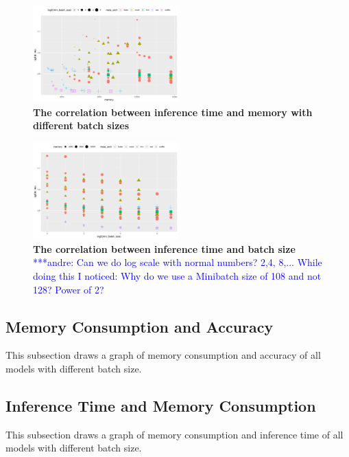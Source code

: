 \documentclass[conference]{IEEEtran}
\newcommand{\alnote}[1]{ {\textcolor{blue} { ***andre: #1 }}}
\newcommand{\alnote}[1]{}
\begin{document}
\begin{figure}[htpb]
	  \centering
	  \includegraphics[width=0.5\textwidth]{RunningTimeVSMemory-Batch}
	  \caption{\textbf{The correlation between inference time and memory with different batch sizes}}
	  \label{fig:running-memory-batch}
\end{figure}

\begin{figure}[htpb]
	  \centering
	  \includegraphics[width=0.5\textwidth]{RunningTimeVSBatch}
	  \caption{\textbf{The correlation between inference time and batch size}\alnote{Can we do log scale with normal numbers? 2,4, 8,... While doing this I noticed: Why do we use a Minibatch size of 108 and not 128? Power of 2?}}

	  \label{fig:running-batch2}
\end{figure}

\subsection{Memory Consumption and Accuracy}
This subsection draws a graph of memory consumption and accuracy of all models with different batch size.

\subsection{Inference Time and Memory Consumption}
This subsection draws a graph of memory consumption and inference time of all models with different batch size.
\end{document}
